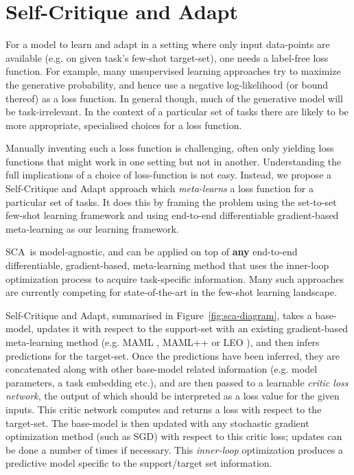 \documentclass{article} \usepackage[dvipsnames]{xcolor}
\newcommand{\proposedmethod}{SCA}
\begin{document}
\section{Self-Critique and Adapt}\label{section:model}
For a model to learn and adapt in a setting where only input data-points are available (e.g. on given task's few-shot target-set), one needs a label-free loss function. For example, many unsupervised learning approaches try to maximize the generative probability, and hence use a negative log-likelihood (or bound thereof) as a loss function. In general though, much of the generative model will be task-irrelevant. In the context of a particular set of tasks there are likely to be more appropriate, specialised choices for a loss function.

Manually inventing such a loss function is challenging, often only yielding loss functions that might work in one setting but not in another. Understanding the full implications of a choice of loss-function is not easy. Instead, we propose a Self-Critique and Adapt approach which \emph{meta-learns} a loss function for a particular set of tasks. It does this by framing the problem using the set-to-set few-shot learning framework and using end-to-end differentiable gradient-based meta-learning as our learning framework.

\proposedmethod\ is model-agnostic, and can be applied on top of \textbf{any} end-to-end differentiable, gradient-based, meta-learning method that uses the inner-loop optimization process to acquire task-specific information. Many such approaches \citep{ravi2016optimization, finn2017model, li2017meta, antoniou2018train, finn2018probabilistic, qiao2018few, rusu2018meta, grant2018recasting} are currently competing for state-of-the-art in the few-shot learning landscape.

Self-Critique and Adapt, summarised in Figure~\ref{fig:sca-diagram}, takes a base-model, updates it with respect to the support-set with an existing gradient-based meta-learning method (e.g.  MAML \citep{finn2017model}, MAML++ \citep{antoniou2018train} or LEO \citep{rusu2018meta}), and then infers predictions for the target-set. Once the predictions have been inferred, they are concatenated along with other base-model related information (e.g. model parameters, a task embedding etc.), and are then passed to a learnable \emph{critic loss network}, the output of which should be interpreted as a loss value for the given inputs. This critic network computes and returns a loss with respect to the target-set. The base-model is then updated with any stochastic gradient optimization method (such as SGD) with respect to this critic loss; updates can be done a number of times if necessary. This \emph{inner-loop} optimization produces a predictive model specific to the support/target set information. 
\end{document}
